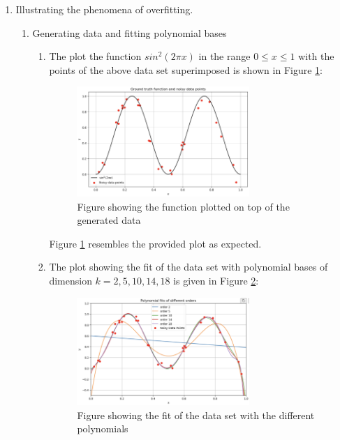 \documentclass[final,3p,times,12pt]{article}
\begin{document}
\begin{enumerate}
    \item Illustrating the phenomena of overfitting.  %
    \begin{enumerate}
        \item Generating data and fitting polynomial bases 
        \begin{enumerate}
            \item The plot the function $sin^2(2\pi x)$ in the range $0 \leq x \leq 1$ with the points of the above data set superimposed is shown in Figure \ref{fig:question_2ai}:

            \begin{figure}[H]
                \centering
                \includegraphics[width=0.7\textwidth]{images/question_2ai.png}
                \caption{Figure showing the function plotted on top of the generated data}
                \label{fig:question_2ai}
            \end{figure}
            Figure \ref{fig:question_2ai} resembles the provided plot as expected. 
            
            \item The plot showing the fit of the data set with polynomial bases of dimension $k = 2, 5, 10, 14, 18$ is given in Figure \ref{fig:question_2aii}:

            \begin{figure}[H]
                \centering
                \includegraphics[width=0.7\textwidth]{images/question_2aii.png}
                \caption{Figure showing the fit of the data set with the different polynomials}
                \label{fig:question_2aii}
            \end{figure}
        \end{enumerate}


\end{enumerate}
\end{enumerate}
\end{document}
